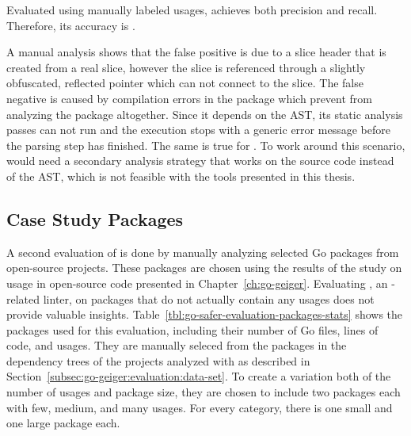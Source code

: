 \begin{hero}
    Evaluated using manually labeled \unsafe{} usages, \toolSafer{} achieves both  precision and
    recall.
    Therefore, its accuracy is .
\end{hero}

A manual analysis shows that the  false positive is due to a slice header that is created from a real
slice, however the slice is referenced through a slightly obfuscated, reflected pointer which \toolSafer{} can not
connect to the slice.
The false negative is caused by compilation errors in the package which prevent \toolSafer{} from analyzing the package
altogether.
Since it depends on the \acrshort{AST}, its static analysis passes can not run and the execution stops with a generic
error message before the parsing step has finished.
The same is true for \toolGosec{}.
To work around this scenario, \toolSafer{} would need a secondary analysis strategy that works on the source code
instead of the \acrshort{AST}, which is not feasible with the tools presented in this thesis.



\subsection{Case Study Packages}\label{subsec:go-safer:evaluation:case-studies}

A second evaluation of \toolSafer{} is done by manually analyzing  selected Go packages from open-source
projects.
These packages are chosen using the results of the study on \unsafe{} usage in open-source code presented in
Chapter~\ref{ch:go-geiger}.
Evaluating \toolSafer{}, an \unsafe{}-related linter, on packages that do not actually contain any \unsafe{} usages does
not provide valuable insights.
Table~\ref{tbl:go-safer-evaluation-packages-stats} shows the  packages used for this evaluation, including
their number of Go files, lines of code, and \unsafe{} usages.
They are manually seleced from the packages in the dependency trees of the projects analyzed with \toolGeiger{} as
described in Section~\ref{subsec:go-geiger:evaluation:data-set}.
To create a variation both of the number of \unsafe{} usages and package size, they are chosen to include two packages
each with few, medium, and many \unsafe{} usages.
For every category, there is one small and one large package each.

